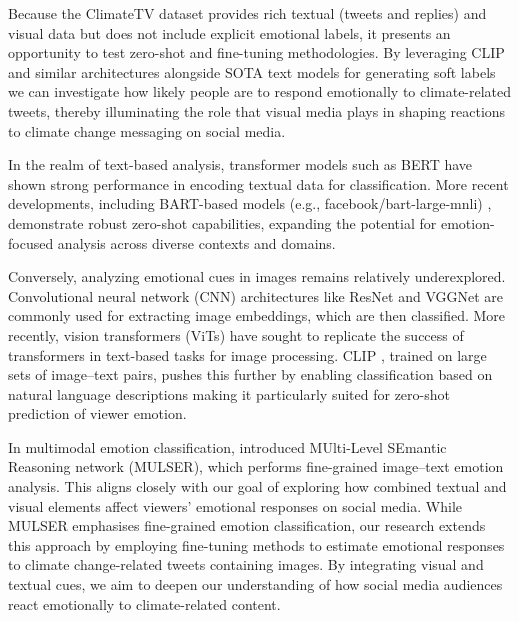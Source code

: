 Because the ClimateTV dataset provides rich textual (tweets and replies) and visual data but does not include explicit emotional labels, it presents an opportunity to test zero-shot and fine-tuning methodologies. By leveraging CLIP and similar architectures alongside SOTA text models for generating soft labels we can investigate how likely people are to respond emotionally to climate-related tweets, thereby illuminating the role that visual media plays in shaping reactions to climate change messaging on social media.
\newline

In the realm of text-based analysis, transformer models such as BERT \cite{DBLP:journals/corr/abs-1810-04805} have shown strong performance in encoding textual data for classification. More recent developments, including BART-based models (e.g., {facebook/bart-large-mnli}) \cite{lewis2019bartdenoisingsequencetosequencepretraining}, demonstrate robust zero-shot capabilities, expanding the potential for emotion-focused analysis across diverse contexts and domains.
\newline

Conversely, analyzing emotional cues in images remains relatively underexplored. Convolutional neural network (CNN) architectures like ResNet \cite{he2015deepresiduallearningimage} and VGGNet \cite{simonyan2015deepconvolutionalnetworkslargescale} are commonly used for extracting image embeddings, which are then classified. More recently, vision transformers (ViTs) \cite{dosovitskiy2021imageworth16x16words} have sought to replicate the success of transformers in text-based tasks for image processing. CLIP \cite{radford2021learningtransferablevisualmodels}, trained on large sets of image–text pairs, pushes this further by enabling classification based on natural language descriptions making it particularly suited for zero-shot prediction of viewer emotion.
\newline

In multimodal emotion classification, \citet{9920172} introduced MUlti-Level SEmantic Reasoning network (MULSER), which performs fine-grained image–text emotion analysis. This aligns closely with our goal of exploring how combined textual and visual elements affect viewers’ emotional responses on social media. While MULSER emphasises fine-grained emotion classification, our research extends this approach by employing fine-tuning methods to estimate emotional responses to climate change-related tweets containing images. By integrating visual and textual cues, we aim to deepen our understanding of how social media audiences react emotionally to climate-related content.
\newline

